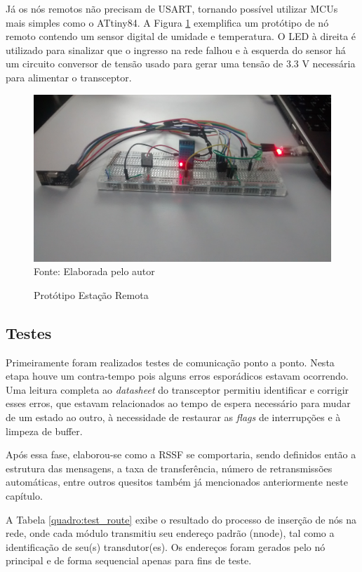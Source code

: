 {Já os nós remotos não precisam de USART, tornando possível utilizar MCUs mais simples como o ATtiny84. A
Figura \ref{figura:prot_remote} exemplifica um protótipo de nó remoto contendo um sensor digital de umidade e
temperatura. O LED à direita é utilizado para sinalizar que o ingresso na rede falhou e à esquerda do sensor
há um circuito conversor de tensão usado para gerar uma tensão de 3.3 V necessária para alimentar o transceptor.

\begin{figure}[H]
	\caption{Protótipo Estação Remota}
	\centering
	\includegraphics[scale=0.1]{../images/prot_remoto.jpg}
	\hspace{\linewidth}
	Fonte: Elaborada pelo autor
	\label{figura:prot_remote}
\end{figure}

\subsection{Testes}
Primeiramente foram realizados testes de comunicação ponto a ponto. Nesta etapa houve um contra-tempo pois
alguns erros esporádicos estavam ocorrendo. Uma leitura completa ao \textit{datasheet} do transceptor permitiu
identificar e corrigir esses erros, que estavam relacionados ao tempo de espera necessário para mudar de um
estado ao outro, à necessidade de restaurar as \textit{flags} de interrupções e à limpeza de buffer.

Após essa fase, elaborou-se como a RSSF se comportaria, sendo definidos então a estrutura das mensagens, a
taxa de transferência, número de retransmissões automáticas, entre outros quesitos também já mencionados
anteriormente neste capítulo.

A Tabela \ref{quadro:test_route} exibe o resultado do processo de inserção de nós na rede, onde cada módulo
transmitiu seu endereço padrão (nnode), tal como a identificação de seu(s) transdutor(es). Os endereços foram
gerados pelo nó principal e de forma sequencial apenas para fins de teste.

}
